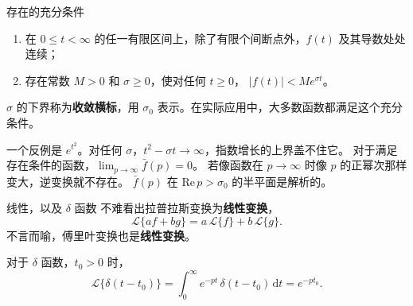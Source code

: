 \documentclass[fontset=windows, chinese, 10pt, xcolor=dvipsnames]{beamer}
\begin{document}
\begin{frame}{存在的充分条件}
  \begin{enumerate}
    \item 在 $0\leq t<\infty$ 的任一有限区间上，除了有限个间断点外，$f(t)$ 及其导数处处连续；
    \item 存在常数 $M>0$ 和 $\sigma\geq 0$，使对任何 $t\geq 0$，
      $|f(t)|<M e^{\sigma t}$。
  \end{enumerate}
  $\sigma$ 的下界称为\textbf{收敛横标}，用 $\sigma_0$ 表示。在实际应用中，大多数函数都满足这个充分条件。
  \vspace{0.3em}

  一个反例是 $e^{t^2}$。对任何 $\sigma$，$t^2-\sigma t\to\infty$，指数增长的上界盖不住它。
  对于满足存在条件的函数，$\lim_{p\to\infty}\bar f(p)=0$。
  若像函数在 $p\to\infty$ 时像 $p$ 的正幂次那样变大，逆变换就不存在。
  $\bar f(p)$ 在 $\mathrm{Re}\,p>\sigma_0$ 的半平面是解析的。
\end{frame}



\begin{frame}{线性，以及 $\delta$ 函数}
  不难看出拉普拉斯变换为\textbf{线性变换}，
  \begin{equation*}
    \mathcal{L}\{af+bg\}
    =a\,\mathcal{L}\{f\}+b\,\mathcal{L}\{g\}.
  \end{equation*}
  不言而喻，傅里叶变换也是\textbf{线性变换}。
  \vspace{0.4em}

  对于 $\delta$ 函数，$t_0>0$ 时，
  \begin{equation*}
    \mathcal{L}\{\delta(t-t_0)\}
    =\int_0^{\infty} e^{-pt}\,\delta(t-t_0)\,\mathrm{d}t
    =e^{-pt_0}.
  \end{equation*}
\end{frame}
\end{document}

